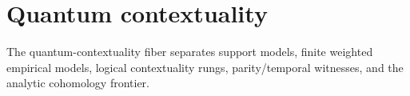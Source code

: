 \section{Quantum contextuality}

The quantum-contextuality fiber separates support models, finite weighted
empirical models, logical contextuality rungs, parity/temporal witnesses, and
the analytic cohomology frontier.






